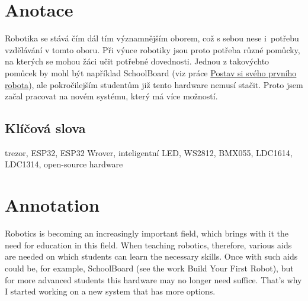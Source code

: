 \documentclass{template/socthesis}
\author{Tomáš Vavrinec} %
\begin{document}
\maketitle %



\pagestyle{empty}

\section*{Anotace}
\color{black}

Robotika se stává čím dál tím významnějším oborem, což s sebou nese i~potřebu vzdělávání v tomto oboru.
Při výuce robotiky jsou proto potřeba různé pomůcky, na kterých se mohou žáci učit potřebné dovednosti. Jednou z takovýchto pomůcek 
by mohl být například SchoolBoard (viz práce \href{https://github.com/TVavrinec/SOC-text/blob/master/SOČ.pdf}{Postav si svého prvního robota}), 
ale pokročilejším studentům již tento hardware nemusí stačit. Proto jsem začal pracovat na novém systému, který má více možností.

\subsection*{Klíčová slova}

\color{black}

trezor, ESP32, ESP32 Wrover, inteligentní LED, WS2812, BMX055, LDC1614, LDC1314, open-source hardware

\newpage %

\vspace{20mm}

\section*{Annotation}
\color{black}

Robotics is becoming an increasingly important field, which brings with it the need for education in this field.
When teaching robotics, therefore, various aids are needed on which students can learn the necessary skills. Once with such aids
could be, for example, SchoolBoard (see the work Build Your First Robot), but for more advanced students this hardware may no 
longer need suffice. That's why I started working on a new system that has more options.
\end{document}
